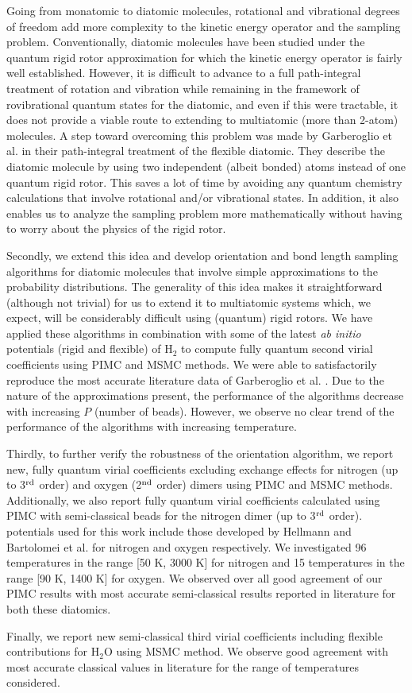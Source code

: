 Going from monatomic to diatomic molecules, rotational and vibrational degrees of freedom add more complexity to the kinetic energy operator and the sampling problem. Conventionally, diatomic molecules have been studied under the quantum rigid rotor approximation for which the kinetic energy operator is fairly well established. However, it is difficult to advance to a full path-integral treatment of rotation and vibration while remaining in the framework of rovibrational quantum states for the diatomic, and even if this were tractable, it does not provide a viable route to extending to multiatomic (more than 2-atom) molecules. A step toward overcoming this problem was made by Garberoglio et al. \cite{Garberoglio2014} in their path-integral treatment of the flexible diatomic. They describe the diatomic molecule by using two independent (albeit bonded) atoms instead of one quantum rigid rotor. This saves a lot of time by avoiding any quantum chemistry calculations that involve rotational and/or vibrational states. In addition, it also enables us to analyze the sampling problem more mathematically without having to worry about the physics of the rigid rotor. 

Secondly, we extend this idea and develop orientation and bond length sampling algorithms for diatomic molecules that involve simple approximations to the probability distributions. The generality of this idea makes it straightforward (although not trivial) for us to extend it to multiatomic systems which, we expect, will be considerably difficult using (quantum) rigid rotors. We have applied these algorithms in combination with some of the latest \emph{ab initio} potentials (rigid and flexible) of H$_2$ to compute fully quantum second virial coefficients using PIMC and MSMC methods. We were able to satisfactorily reproduce the most accurate literature data of Garberoglio et al. \cite{Garberoglio2014}. Due to the nature of the approximations present, the performance of the algorithms decrease with increasing $P$ (number of beads). However, we observe no clear trend of the performance of the algorithms with increasing temperature.

Thirdly, to further verify the robustness of the orientation algorithm, we report new, fully quantum virial coefficients excluding exchange effects for nitrogen (up to 3${\rm ^{rd}}$ order) and oxygen (2${\rm ^{nd}}$ order) dimers using PIMC and MSMC methods. Additionally, we also report fully quantum virial coefficients calculated using PIMC with semi-classical beads for the nitrogen dimer (up to 3${\rm ^{rd}}$ order). \AbInitio{} potentials used for this work include those developed by Hellmann \cite{Hellmann2013} and Bartolomei et al. \cite{Bartolomei2010} for nitrogen and oxygen respectively. We investigated 96 temperatures in the range [50 K, 3000 K] for nitrogen and 15 temperatures in the range [90 K, 1400 K] for oxygen. We observed over all good agreement of our PIMC results with most accurate semi-classical results reported in literature for both these diatomics.

Finally, we report new semi-classical third virial coefficients including flexible contributions for H$_2$O using MSMC method. We observe good agreement with most accurate classical values in literature for the range of temperatures considered.
